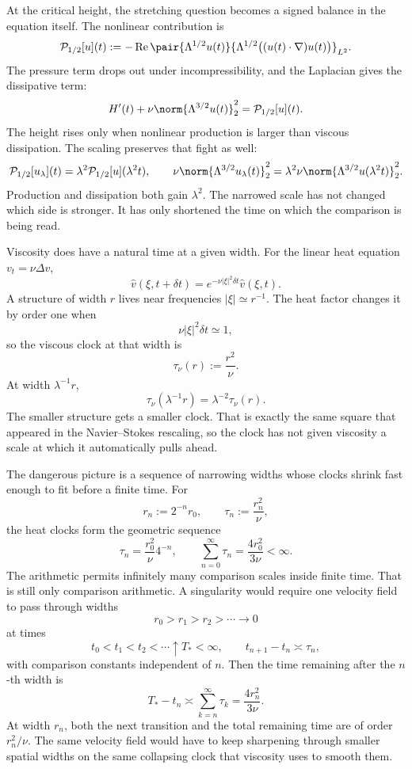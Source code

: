 
At the critical height, the stretching question becomes a signed balance in the equation itself.
The nonlinear contribution is
\[
  \mathcal P_{1/2}[u](t)
  :=
  -\operatorname{Re}
  \pair
    {\Lambda^{1/2}u(t)}
    {\Lambda^{1/2}\bigl((u(t)\cdot\nabla)u(t)\bigr)}_{L^2}.
\]
The pressure term drops out under incompressibility, and the Laplacian gives the dissipative term:
\[
  H'(t)
  +
  \nu\norm{\Lambda^{3/2}u(t)}_2^2
  =
  \mathcal P_{1/2}[u](t).
\]
The height rises only when nonlinear production is larger than viscous dissipation.
The scaling preserves that fight as well:
\[
  \mathcal P_{1/2}[u_\lambda](t)
  =
  \lambda^2\mathcal P_{1/2}[u](\lambda^2t),
  \qquad
  \nu\norm{\Lambda^{3/2}u_\lambda(t)}_2^2
  =
  \lambda^2\nu\norm{\Lambda^{3/2}u(\lambda^2t)}_2^2.
\]
Production and dissipation both gain \(\lambda^2\).
The narrowed scale has not changed which side is stronger.
It has only shortened the time on which the comparison is being read.


Viscosity does have a natural time at a given width.
For the linear heat equation \(v_t=\nu\Delta v\),
\[
  \widehat v(\xi,t+\delta t)
  =
  e^{-\nu|\xi|^2\delta t}\widehat v(\xi,t).
\]
A structure of width \(r\) lives near frequencies \(|\xi|\simeq r^{-1}\).
The heat factor changes it by order one when
\[
  \nu|\xi|^2\delta t\simeq1,
\]
so the viscous clock at that width is
\[
  \tau_\nu(r)
  :=
  \frac{r^2}{\nu}.
\]
At width \(\lambda^{-1}r\),
\[
  \tau_\nu(\lambda^{-1}r)
  =
  \lambda^{-2}\tau_\nu(r).
\]
The smaller structure gets a smaller clock.
That is exactly the same square that appeared in the Navier--Stokes rescaling, so the clock has not given viscosity a scale at which it automatically pulls ahead.


The dangerous picture is a sequence of narrowing widths whose clocks shrink fast enough to fit before a finite time.
For
\[
  r_n:=2^{-n}r_0,
  \qquad
  \tau_n:=\frac{r_n^2}{\nu},
\]
the heat clocks form the geometric sequence
\[
  \tau_n
  =
  \frac{r_0^2}{\nu}4^{-n},
  \qquad
  \sum_{n=0}^{\infty}\tau_n
  =
  \frac{4r_0^2}{3\nu}
  <
  \infty.
\]
The arithmetic permits infinitely many comparison scales inside finite time.
That is still only comparison arithmetic.
A singularity would require one \NavierStokes{} velocity field to pass through widths
\[
  r_0>r_1>r_2>\cdots\longrightarrow0
\]
at times
\[
  t_0<t_1<t_2<\cdots\uparrow T_*<\infty,
  \qquad
  t_{n+1}-t_n\asymp\tau_n,
\]
with comparison constants independent of \(n\).
Then the time remaining after the \(n\)-th width is
\[
  T_*-t_n
  \asymp
  \sum_{k=n}^{\infty}\tau_k
  =
  \frac{4r_n^2}{3\nu}.
\]
At width \(r_n\), both the next transition and the total remaining time are of order \(r_n^2/\nu\).
The same velocity field would have to keep sharpening through smaller spatial widths on the same collapsing clock that viscosity uses to smooth them.
